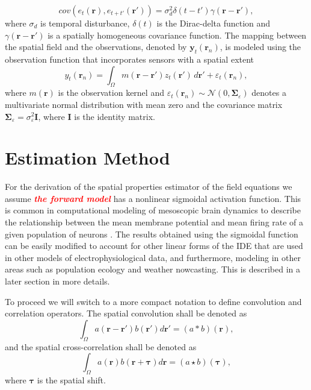 \documentclass[10pt,twocolumn,twoside]{IEEEtran}
\newcommand{\dean}[1]{\textsf{\emph{\textbf{\textcolor{red}{#1}}}}}
\begin{document}
\begin{equation}
cov\left(e_{t}\left(\mathbf{r}\right),e_{t+t'}\left(\mathbf{r'}\right)\right)=\sigma_d^2\delta(t-t')\gamma(\mathbf{r}-\mathbf{r'}),
\label{eq:FieldDisturbance}
\end{equation}
where $\sigma_d$ is temporal disturbance, $\delta(t)$ is the Dirac-delta function and $\gamma(\mathbf{r}-\mathbf{r'})$ is a spatially homogeneous covariance function. The mapping between the spatial field and the observations, denoted by $\mathbf{y}_t(\mathbf{r}_n)$, is modeled using the observation function that incorporates sensors with a spatial extent
\begin{equation}\label{eq:ObservationEquation}
	y_t(\mathbf{r}_n) = \int_{\Omega} { m\left(\mathbf{r}-\mathbf{r}'\right) z_t\left(\mathbf{r}'\right) \, d\mathbf{r}'} + \varepsilon_t(\mathbf{r}_n), 
\end{equation}
where $m\left(\mathbf{r}\right)$ is the observation kernel and $\varepsilon_t(\mathbf{r}_n) \sim \mathcal{N}\left(0,\boldsymbol{\Sigma}_{\varepsilon}\right)$ denotes a multivariate normal distribution with mean zero and the covariance matrix $\boldsymbol{\Sigma}_{\varepsilon} = \sigma_{\varepsilon}^2\mathbf{I}$, where $\mathbf{I}$ is the identity matrix.

\section{Estimation Method}\label{sec:EstimationMethod}
For the derivation of the spatial properties estimator of the field equations we assume \dean{the forward model} has a nonlinear sigmoidal activation function. This is common in computational modeling of mesoscopic brain dynamics to describe the relationship between the mean membrane potential and mean firing rate of a given population of neurons \cite{Freeman1975}. The results obtained using the sigmoidal function can be easily modified to account for other linear forms of the IDE that are used in other models of electrophysiological data, and furthermore, modeling in other areas such as population ecology and weather nowcasting. This is described in a later section in more details. 

To proceed we will switch to a more compact notation to define convolution and correlation operators. The spatial convolution shall be denoted as
\begin{equation}
	\int_\Omega a(\mathbf{r}-\mathbf{r}')b(\mathbf{r}')d\mathbf{r}' = (a\ast b)(\mathbf{r}),
\end{equation}
and the spatial cross-correlation shall be denoted as 
\begin{equation}
	\int_\Omega a(\mathbf{r})b(\mathbf{r}+\boldsymbol{\tau})d\mathbf{r} = (a\star b)(\boldsymbol{\tau}),
\end{equation} 
where $\boldsymbol{\tau}$ is the spatial shift.
\end{document}
